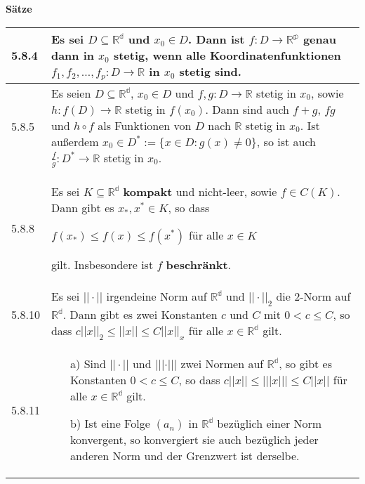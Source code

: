     \noindent 
    \textbf{Sätze}
    \begin{table}[H]
    \begin{tabularx}{\textwidth}{X m{16cm}}
        \toprule

        5.8.4 & Es sei $D \subseteq \mathbb{R^d}$ und $x_0 \in D$. Dann ist $f: D \rightarrow \mathbb{R^p}$ genau dann in $x_0$
                \textbf{stetig}, wenn alle Koordinatenfunktionen $f_1, f_2, \dots, f_p : D \rightarrow \mathbb{R}$ in $x_0$ stetig sind. \\
        \midrule
        5.8.5 &  Es seien $D \subseteq \mathbb{R^d}$, $x_0 \in D$ und $f,g : D \rightarrow \mathbb{R}$ stetig in $x_0$, sowie
                $h : f(D) \rightarrow \mathbb{R}$ stetig in $f(x_0)$. Dann sind auch $f+g$, $fg$ und $h \circ f$ als Funktionen
                von $D$ nach $\mathbb{R}$ stetig in $x_0$. \hfill \break
                Ist au\ss erdem $x_0 \in D^* := \{x \in D: g(x) \neq 0\}$, so ist auch $\frac{f}{g}:D^* \rightarrow \mathbb{R}$ stetig in $x_0$. \\
        \midrule
        5.8.8 & Es sei $K \subseteq \mathbb{R^d}$ \textbf{kompakt} und nicht-leer, sowie $f \in C(K)$. Dann gibt es $x_*, x^* \in K$, so dass \hfill \break
                \centerline{$f(x_*) \leq f(x) \leq f(x^*)$ für alle $x \in K$}
                gilt. Insbesondere ist $f$ \textbf{beschränkt}. \\
        \midrule
        5.8.10& Es sei $||\cdot||$ irgendeine Norm auf $\mathbb{R^d}$ und $||\cdot||_2$ die 2-Norm auf $\mathbb{R^d}$. Dann gibt es zwei Konstanten
                $c$ und $C$ mit $0 < c \leq C$, so dass $c||x||_2  \leq ||x|| \leq C ||x||_x$ für alle $x \in \mathbb{R^d}$ gilt. \\
        \midrule
        5.8.11& \begin{itemize}[topsep=-0.5cm]
                    \item[a)] Sind $||\cdot||$ und $|||\cdot|||$ zwei Normen auf $\mathbb{R^d}$, so gibt es Konstanten $0 < c \leq C$, so dass
                                $c||x|| \leq |||x||| \leq C||x||$ für alle $x \in \mathbb{R^d}$ gilt.
                    \item[b)] Ist eine Folge $(a_n)$ in $\mathbb{R^d}$ bezüglich einer Norm konvergent, so konvergiert sie auch bezüglich  
                                jeder anderen Norm und der Grenzwert ist derselbe. 
                \end{itemize} \vspace{-0cm} \\
        \bottomrule
    \end{tabularx}
    \end{table}

